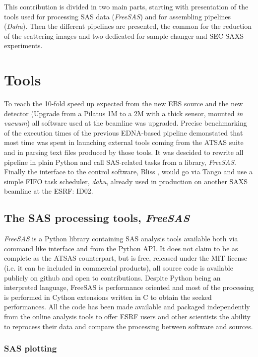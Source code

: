 \documentclass[preprint]{iucr}              %
\begin{document}
This contribution is divided in two main parts, starting with presentation of the tools used for 
processing SAS data (\textit{FreeSAS}) and for assembling pipelines (\textit{Dahu}).
Then the different pipelines are presented, the common for the reduction of the scattering images and two dedicated for sample-changer and SEC-SAXS experiments.      

\section{Tools}

To reach the 10-fold speed up expected from the new EBS source and the new detector (Upgrade from a Pilatus 1M to a 2M with a thick sensor, mounted \textit{in vacuum})
all software used at the beamline was upgraded.
Precise benchmarking of the execution times of the previous EDNA-based pipeline demonstated that 
most time was spent in launching external tools coming from the ATSAS suite and in parsing text files produced by those tools.
It was descided to rewrite all pipeline in plain Python \cite{Python} and call SAS-related tasks from a library, \textit{FreeSAS}. 
Finally the interface to the control software, Bliss \cite{bliss}, would go via Tango \cite{tango} and use a simple FIFO task scheduler,  \textit{dahu}, 
already used in production on another SAXS beamline at the ESRF: ID02\cite{ID02}.   

\subsection{The SAS processing tools, \textit{FreeSAS}}

\textit{FreeSAS} is a Python\cite{python} library containing SAS analysis tools available both via command like interface and from the Python API. 
It does not claim to be as complete as the ATSAS counterpart,
but is free, released under the MIT license (i.e. it can be included in commercial products), all source code is available publicly on github \cite{freesas} and
open to contributions.
Despite Python being an interpreted language, FreeSAS is performance oriented and most of the processing is performed in Cython\cite{cython} extensions written in C 
to obtain the seeked performances. 
All the code has been made available and packaged independently from the online analysis tools to offer ESRF users and other scientists
the ability to reprocess their data and compare the processing between software and sources.

\subsubsection{SAS plotting}
\end{document}
